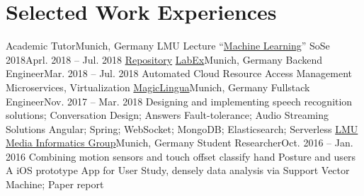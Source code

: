 \section{\textbf{Selected Work Experiences}}
  \resumeSubHeadingListStart
    \resumeSubheading
      {Academic Tutor}{Munich, Germany}
      {LMU Lecture ``\href{http://www.dbs.ifi.lmu.de/cms/studium_lehre/lehre_master/ml18/index.html}{Machine Learning}'' SoSe 2018}{Aprl. 2018 -- Jul. 2018}
      \resumeItemListStart
          {\href{https://github.com/changkun/ss18-machine-learning-tutorial}{Repository}}
      \resumeItemListEnd
    \resumeSubheading
      {\href{https://labex.io/}{LabEx}}{Munich, Germany}
      {Backend Engineer}{Mar. 2018 -- Jul. 2018}
      \resumeItemListStart
          {Automated Cloud Resource Access Management Microservices, Virtualization}
      \resumeItemListEnd
    \resumeSubheading
    {\href{https://magiclingua.com/}{MagicLingua}}{Munich, Germany}
    {Fullstack Engineer}{Nov. 2017 -- Mar. 2018}
    \resumeItemListStart
        {Designing and implementing speech recognition solutions; Conversation Design; Answers Fault-tolerance; Audio Streaming Solutions}
        {Angular; Spring; WebSocket; MongoDB; Elasticsearch; Serverless}
    \resumeItemListEnd
    \resumeSubheading
      {\href{http://www.medien.ifi.lmu.de}{LMU Media Informatics Group}}{Munich, Germany}
      {Student Researcher}{Oct. 2016 -- Jan. 2016}
      \resumeItemListStart
          {Combining motion sensors and touch offset classify hand Posture and users}
          {A iOS prototype App for User Study, densely data analysis via Support Vector Machine; Paper report}
      \resumeItemListEnd
  \resumeSubHeadingListEnd